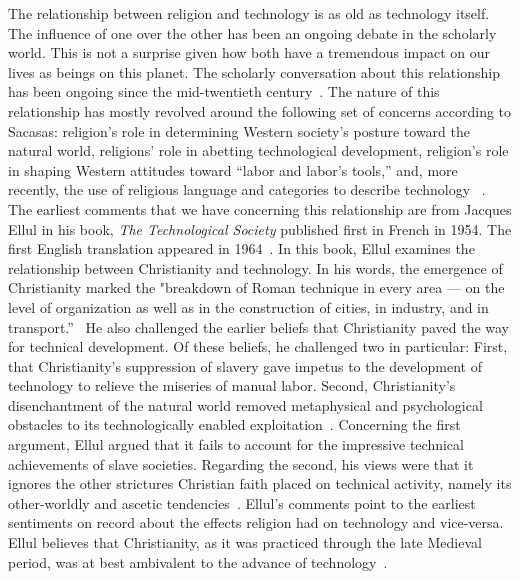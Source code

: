 The relationship between religion and technology is as old as technology itself. The influence of one over the other has been an ongoing debate in the scholarly world. This is not a surprise given how both have a tremendous impact on our lives as beings on this planet. The scholarly conversation about this relationship has been ongoing since the mid-twentieth century~\cite{Sacasas}. The nature of this relationship has mostly revolved around the following set of concerns according to Sacasas: religion’s role in determining Western society’s posture toward the natural world, religions’ role in abetting technological development, religion’s role in shaping Western attitudes toward “labor and labor’s tools,” and, more recently, the use of religious language and categories to describe technology ~\cite{Sacasas}. The earliest comments that we have concerning this relationship are from Jacques Ellul in his book, \textit{The Technological Society} published first in French in 1954. The first English translation appeared in 1964~\cite{Sacasas}. In this book, Ellul examines the relationship between Christianity and technology. In his words, the emergence of Christianity marked the "breakdown of Roman technique in every area — on the level of organization as well as in the construction of cities, in industry, and in transport.”~\cite{Sacasas} He also challenged the earlier beliefs that Christianity paved the way for technical development. Of these beliefs, he challenged two in particular: First, that Christianity’s suppression of slavery gave impetus to the development of technology to relieve the miseries of manual labor. Second, Christianity’s disenchantment of the natural world removed metaphysical and psychological obstacles to its technologically enabled exploitation~\cite{Sacasas}. Concerning the first argument, Ellul argued that it fails to account for the impressive technical achievements of slave societies. Regarding the second, his views were that it ignores the other strictures Christian faith placed on technical activity, namely its other-worldly and ascetic tendencies~\cite{Sacasas}. Ellul's comments point to the earliest sentiments on record about the effects religion had on technology and vice-versa. Ellul believes that Christianity, as it was practiced through the late Medieval period, was at best ambivalent to the advance of technology~\cite{Sacasas}.

